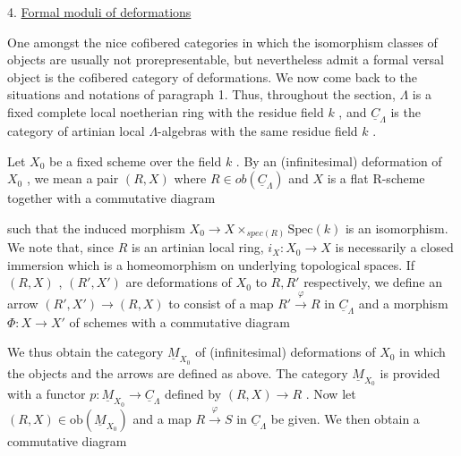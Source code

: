 4.  \underline{Formal moduli of deformations}

One amongst the nice cofibered categories in which the isomorphism classes of objects are usually not prorepresentable, but nevertheless admit a formal versal object is the cofibered category of deformations. We now come back to the situations and notations of paragraph 1. Thus, throughout the section,  $\Lambda$  is a fixed complete local noetherian ring with the residue field  $k$ , and  $\underline{C}_{\Lambda}$  is the category of artinian local $\Lambda$-algebras with the same residue field  $k$ .

Let  $X_0$  be a fixed scheme over the field  $k$ . By an (infinitesimal) deformation of  $X_0$ , we mean a pair  $(R, X)$  where  $R \in ob(\underline{C}_{\Lambda})$  and  $X$  is a flat R-scheme together with a commutative diagram


such that the induced morphism $X_0 \to X \times_{spec(R)} \mathrm{Spec}(k)$ is an isomorphism. We note that, since $R$ is an artinian local ring, $i_X : X_0 \to X$ is necessarily a closed immersion which is a homeomorphism on underlying topological spaces. If $(R, X)$ , $(R', X')$ are deformations of $X_0$ to $R, R'$ respectively, we define an arrow $(R', X') \to (R, X)$ to consist of a map $R' \xrightarrow{\ \varphi\ } R$ in $\underline{C}_\Lambda$ and a morphism $\Phi : X \to X'$ of schemes with a commutative diagram

\begin{center}
\end{center}
We thus obtain the category $\underline{M}_{X_0}$ of (infinitesimal) deformations of $X_0$ in which the objects and the arrows are defined as above. The category $\underline{M}_{X_0}$ is provided with a functor $p : \underline{M}_{X_0} \to \underline{C}_\Lambda$ defined by $(R, X) \to R$ . Now let $(R, X) \in \mathrm{ob}(\underline{M}_{X_0})$ and a map $R \xrightarrow{\ \varphi\ } S$ in $\underline{C}_\Lambda$ be given. We then obtain a commutative diagram

